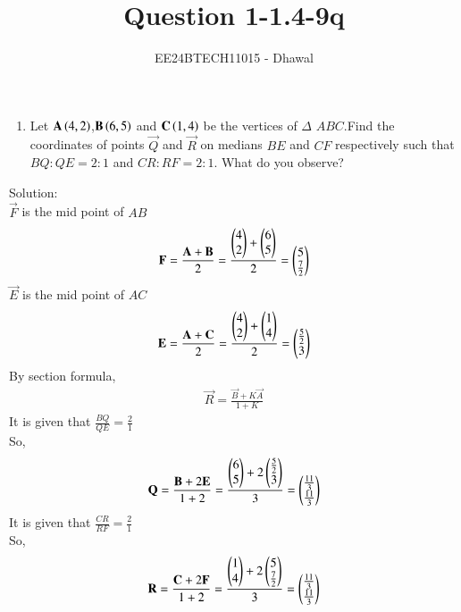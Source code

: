 \documentclass[journal]{IEEEtran}
\numberwithin{equation}{enumi}
\numberwithin{figure}{enumi}
\begin{document}

\title{Question 1-1.4-9q}
\author{EE24BTECH11015 - Dhawal}
{\let\newpage\relax\maketitle}
\begin{enumerate}
	\item Let $\mathbf{A}\left(4,2\right)$,$\mathbf{B}\left(6,5\right)$ and $\mathbf{C}\left(1,4\right)$ be the vertices of $\Delta$ $ABC$.Find the coordinates of points $\vec{Q}$ and $\vec{R}$ on medians $BE$ and $CF$ respectively such that $BQ:QE=2:1$ and $CR:RF=2:1$. What do you observe?
\end{enumerate}
Solution:\\
$\vec{F}$ is the mid point of $AB$\\
\begin{align}
	\mathbf{F}=\frac{\mathbf{A}+\mathbf{B}}{2}=\frac{\begin{pmatrix}4\\2\end{pmatrix} + \begin{pmatrix}6\\5\end{pmatrix}}{2}
=\begin{pmatrix}5\\ \frac{7}{2}\end{pmatrix}
\end{align}
$\vec{E}$ is the mid point of $AC$\\
\begin{align}
	\mathbf{E}=\frac{\mathbf{A}+\mathbf{C}}{2}=\frac{\begin{pmatrix}4\\2\end{pmatrix} + \begin{pmatrix}1\\4\end{pmatrix}}{2}
=\begin{pmatrix}\frac{5}{2}\\3\end{pmatrix}
\end{align}
By section formula,
\begin{align}
	\vec{R}=\frac{\vec{B}+K\vec{A}}{1+K}
\end{align}
It is given that $\frac{BQ}{QE}=\frac{2}{1}$\\
So,\\
\begin{align}
	\mathbf{Q}=\frac{\mathbf{B}+2\mathbf{E}}{1+2}=\frac{\begin{pmatrix}6\\5\end{pmatrix} + 2\begin{pmatrix}\frac{5}{2}\\3\end{pmatrix}}{3}=\begin{pmatrix}\frac{11}{3}\\ \frac{11}{3}\end{pmatrix}
\end{align}
It is given that $\frac{CR}{RF}=\frac{2}{1}$\\
So,\\
\begin{align}
	\mathbf{R}=\frac{\mathbf{C}+2\mathbf{F}}{1+2}=\frac{\begin{pmatrix}1\\4\end{pmatrix} + 2\begin{pmatrix}5\\\frac{7}{2}\end{pmatrix}}{3}=\begin{pmatrix}\frac{11}{3}\\ \frac{11}{3}\end{pmatrix}
\end{align}
\end{document}
